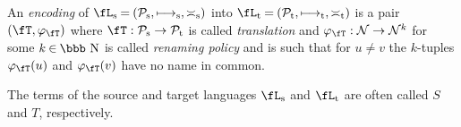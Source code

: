 \documentclass[runningheads]{llncs}
\newcommand{\pT}{T}                      %
\newcommand{\N} {{\cal N}}               %
\newcommand{\subtrans}{\fT}
\begin{document}
\begin{definition}\rm\label{df:encoding}
An \emph{encoding} of $\fL_{\rm s}\mathbin=(\mathcal{P}_{\rm s},\longmapsto_{\rm s},\asymp_{\rm s})$
into $\fL_{\rm t}\mathbin=(\mathcal{P}_{\rm t},\longmapsto_{\rm t},\asymp_{\rm t})$ is a pair
$(\fT,\varphi_{\subtrans})$ where
$\fT:\mathcal{P}_{\rm s}\rightarrow\mathcal{P}_{\rm t}$ is called \emph{translation}
and $\varphi_{\subtrans}:\N\rightarrow\N^k$ for some $k\mathbin\in\mbox{\bbb N}$
is called \emph{renaming policy} and is such that for $u\neq v$ the
$k$-tuples $\varphi_{\subtrans}(u)$ and $\varphi_{\subtrans}(v)$ have no name in common.
\end{definition}
\noindent
The terms of the source and target languages $\fL_{\rm s}$ and
$\fL_{\rm t}$ are often called $S$ and $\pT$, respectively.
\end{document}

